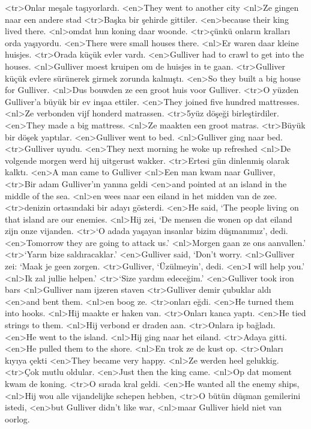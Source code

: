 <tr>Onlar meşale taşıyorlardı.
<en>They went to another city
<nl>Ze gingen naar een andere stad
<tr>Başka bir şehirde gittiler.
<en>because their king lived there.
<nl>omdat hun koning daar woonde.
<tr>çünkü onların kralları orda yaşıyordu.
<en>There were small houses there.
<nl>Er waren daar kleine huisjes.
<tr>Orada küçük evler vardı.
<en>Gulliver had to crawl to get into the houses.
<nl>Gulliver moest kruipen om de huisjes in te gaan.
<tr>Gulliver küçük evlere sürünerek girmek zorunda kalmıştı.
<en>So they built a big house for Gulliver.
<nl>Dus bouwden ze een groot huis voor Gulliver.
<tr>O yüzden Gulliver’a büyük bir ev inşaa ettiler.
<en>They joined five hundred mattresses.
<nl>Ze verbonden vijf honderd  matrassen.
<tr>5yüz döşeği birleştirdiler.
<en>They made a big mattress.
<nl>Ze maakten een groot matras.
<tr>Büyük bir döşek yaptılar.
<en>Gulliver went to bed.
<nl>Gulliver ging naar bed.
<tr>Gulliver uyudu.
<en>They next morning he woke up refreshed
<nl>De volgende morgen werd hij uitgerust wakker.
<tr>Ertesi gün dinlenmiş olarak kalktı.
<en>A man came to Gulliver
<nl>Een man kwam naar Gulliver,
<tr>Bir adam Gulliver’ın yanına geldi
<en>and pointed at an island in the middle of the sea.
<nl>en wees naar een eiland in het midden van de zee.
<tr>denizin ortasındaki bir adayı gösterdi.
<en>He said, `The people living on that island are our enemies.
<nl>Hij zei, `De mensen die wonen op dat eiland zijn onze vijanden.
<tr>`O adada yaşayan insanlar bizim düşmanımız', dedi.
<en>Tomorrow they are going to attack us.'
<nl>Morgen gaan ze ons aanvallen.'
<tr>`Yarın bize saldıracaklar.'
<en>Gulliver said, `Don’t worry.
<nl>Gulliver zei: `Maak je geen zorgen.
<tr>Gulliver, `Üzülmeyin', dedi.
<en>I will help you.'
<nl>Ik zal jullie helpen.'
<tr>`Size yardım edeceğim.'
<en>Gulliver took iron bars
<nl>Gulliver nam ijzeren staven
<tr>Gulliver demir çubuklar aldı
<en>and bent them.
<nl>en boog ze.
<tr>onları eğdi.
<en>He turned them into hooks.
<nl>Hij maakte er haken van.
<tr>Onları kanca yaptı.
<en>He tied strings to them.
<nl>Hij verbond er draden aan. 
<tr>Onlara ip bağladı.
<en>He went to the island.
<nl>Hij ging naar het eiland.
<tr>Adaya gitti.
<en>He pulled them to the shore.
<nl>En trok ze de kust op.
<tr>Onları kıyıya çekti
<en>They became very happy.
<nl>Ze werden heel gelukkig.
<tr>Çok mutlu oldular.
<en>Just then the king came.
<nl>Op dat moment kwam de koning.
<tr>O sırada kral geldi.
<en>He wanted all the enemy ships,
<nl>Hij wou alle vijandelijke schepen hebben,
<tr>O bütün düşman gemilerini istedi,
<en>but Gulliver didn’t like war,
<nl>maar Gulliver hield niet van oorlog.
